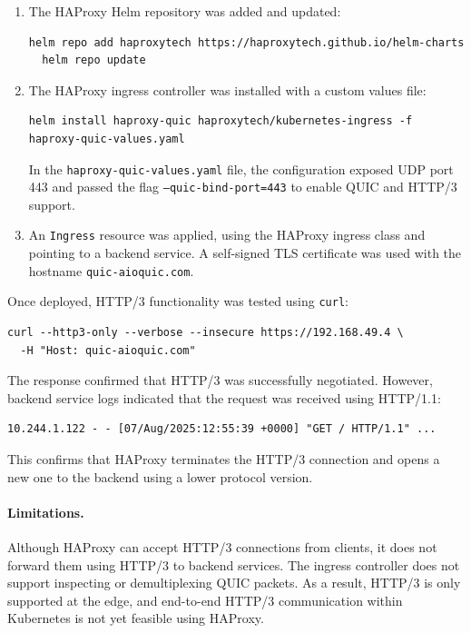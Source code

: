 \begin{enumerate}
  \item The HAProxy Helm repository was added and updated:
  \begin{lstlisting}[breaklines=true,basicstyle=\small\ttfamily,frame=single]
  helm repo add haproxytech https://haproxytech.github.io/helm-charts
  helm repo update
  \end{lstlisting}

  \item The HAProxy ingress controller was installed with a custom values file:
  \begin{lstlisting}[breaklines=true,basicstyle=\small\ttfamily,frame=single]
  helm install haproxy-quic haproxytech/kubernetes-ingress -f haproxy-quic-values.yaml
  \end{lstlisting}

  In the \texttt{haproxy-quic-values.yaml} file, the configuration exposed UDP port 443 and passed the flag \texttt{--quic-bind-port=443} to enable QUIC and HTTP/3 support.

  \item An \texttt{Ingress} resource was applied, using the HAProxy ingress class and pointing to a backend service. A self-signed TLS certificate was used with the hostname \texttt{quic-aioquic.com}.
\end{enumerate}

Once deployed, HTTP/3 functionality was tested using \texttt{curl}:

\begin{lstlisting}[breaklines=true,basicstyle=\small\ttfamily,frame=single]
curl --http3-only --verbose --insecure https://192.168.49.4 \
  -H "Host: quic-aioquic.com"
\end{lstlisting}

The response confirmed that HTTP/3 was successfully negotiated. However, backend service logs indicated that the request was received using HTTP/1.1:

\begin{lstlisting}[breaklines=true,basicstyle=\small\ttfamily,frame=single]
10.244.1.122 - - [07/Aug/2025:12:55:39 +0000] "GET / HTTP/1.1" ...
\end{lstlisting}

This confirms that HAProxy terminates the HTTP/3 connection and opens a new one to the backend using a lower protocol version.

\paragraph{Limitations.}
Although HAProxy can accept HTTP/3 connections from clients, it does not forward them using HTTP/3 to backend services. The ingress controller does not support inspecting or demultiplexing QUIC packets. As a result, HTTP/3 is only supported at the edge, and end-to-end HTTP/3 communication within Kubernetes is not yet feasible using HAProxy.



